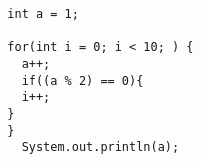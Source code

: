 \documentclass{article}
\begin{document}
\begin{flushleft}
\begin{comment}
\begin{tabu} to 1.8\textwidth { | X[l] | X[c] | X[r] | }
 \hline
 Iterat  & Value of I & item 13 \\
 \hline
 item 21  & item 22  & item 23  \\

 \hline
\end{tabu}
\end{comment}



\begin{verbatim}
  int a = 1;
  
  for(int i = 0; i < 10; ) {
    a++;
    if((a % 2) == 0){
    i++;
  }
  }
    System.out.println(a);
\end{verbatim}














\end{flushleft}










\begin{comment}
\begin{verbatim}
  int main() {
    printf('hello world'):
    return 0;
  }
\end{verbatim}
\end{comment}
\end{document}

